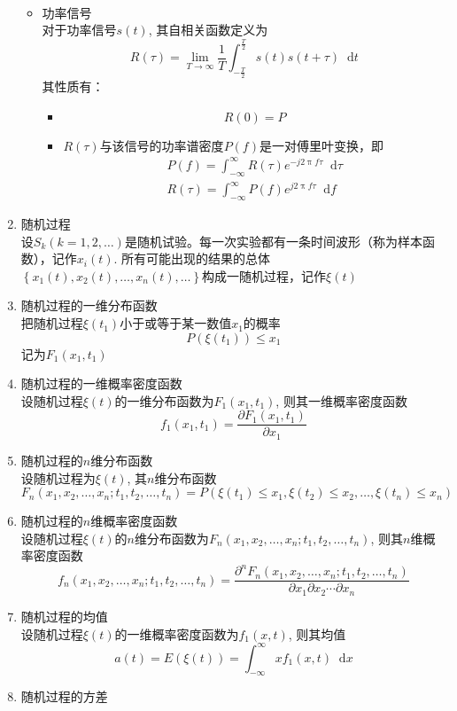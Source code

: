 \documentclass[UTF8]{ctexrep}
\newcommand{\dif}{\mathop{}\!{}\mathrm{d}}
\def\pth#1{\left( {#1}\right)}
\def\brace#1{\left\{ {#1}\right\}}
\begin{document}
\begin{enumerate}
\begin{itemize}
\begin{itemize}
\begin{gather*}
\end{gather*}
\end{itemize}
\item 功率信号\\
对于功率信号$s(t)$, 其自相关函数定义为
\[R(\tau)=\lim_{T\to\infty}\frac{1}{T}\int_{-\frac{T}{2}}^{\frac{T}{2}}s(t)s(t+\tau)\dif t\]
其性质有：
\begin{itemize}
\item \[R(0)=P\]
\item $R(\tau)$与该信号的功率谱密度$P(f)$是一对傅里叶变换，即
\begin{gather*}
P(f)=\int_{-\infty}^{\infty}R(\tau)e^{-j2\uppi f\tau}\dif \tau\\
R(\tau)=\int_{-\infty}^{\infty}P(f)e^{j2\uppi f\tau}\dif f
\end{gather*}
\end{itemize}
\end{itemize}
\item 随机过程\\
设$S_k(k=1, 2,\ldots)$是随机试验。每一次实验都有一条时间波形（称为样本函数），记作$x_i(t)$. 所有可能出现的结果的总体$\brace{x_1(t), x_2(t), \ldots ,x_n(t), \ldots}$构成一随机过程，记作$\xi(t)$
\item 随机过程的一维分布函数\\
把随机过程$\xi(t_1)$小于或等于某一数值$x_1$的概率
\[P(\xi(t_1))\leq x_1\]
记为$F_1(x_1, t_1)$
\item 随机过程的一维概率密度函数\\
设随机过程$\xi(t)$的一维分布函数为$F_1(x_1, t_1)$, 则其一维概率密度函数
\[f_1(x_1, t_1)=\frac{\partial F_1(x_1, t_1)}{\partial x_1}\]
\item 随机过程的$n$维分布函数\\
设随机过程为$\xi(t)$, 其$n$维分布函数
\[F_n(x_1, x_2, \ldots, x_n; t_1, t_2, \ldots, t_n)=P\pth{\xi(t_1)\leq x_1, \xi(t_2)\leq x_2, \ldots, \xi(t_n)\leq x_n}\]
\item 随机过程的$n$维概率密度函数\\
设随机过程$\xi(t)$的$n$维分布函数为$F_n(x_1, x_2, \ldots, x_n; t_1, t_2, \ldots, t_n)$, 则其$n$维概率密度函数
\[f_n(x_1, x_2, \ldots, x_n; t_1, t_2, \ldots, t_n)=\frac{\partial ^nF_n(x_1, x_2, \ldots, x_n; t_1, t_2, \ldots, t_n)}{\partial x_1\partial x_2\cdots\partial x_n}\]
\item 随机过程的均值\\
设随机过程$\xi(t)$的一维概率密度函数为$f_1(x, t)$, 则其均值
\[a(t)=E\pth{\xi(t)}=\int_{-\infty}^{\infty}xf_1(x, t)\dif x\]
\item 随机过程的方差\\

\end{enumerate}
\end{document}
